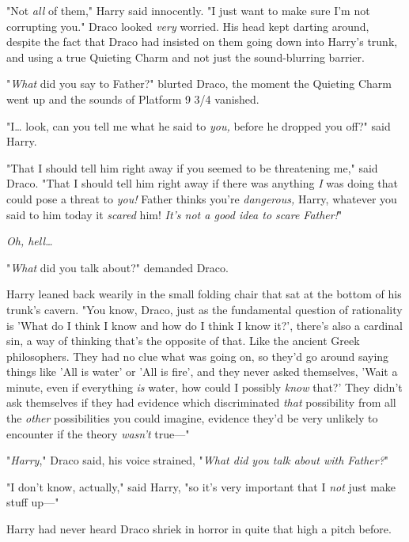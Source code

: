 "Not \emph{all} of them," Harry said innocently. "I just want to make sure I'm 
not corrupting you."
\sbreak
Draco looked \emph{very} worried. His head kept darting around, despite the 
fact that Draco had insisted on them going down into Harry's trunk, and using a 
true Quieting Charm and not just the sound-blurring barrier.

"\emph{What} did you say to Father?" blurted Draco, the moment the Quieting 
Charm went up and the sounds of Platform 9 3/4 vanished.

"I{\ldots} look, can you tell me what he said to \emph{you,} before he dropped 
you off?" said Harry.

"That I should tell him right away if you seemed to be threatening me," said 
Draco. "That I should tell him right away if there was anything \emph{I} was 
doing that could pose a threat to \emph{you!} Father thinks you're 
\emph{dangerous,} Harry, whatever you said to him today it \emph{scared} him! 
\emph{It's not a good idea to scare Father!}"

\emph{Oh, hell{\ldots}}

"\emph{What} did you talk about?" demanded Draco.

Harry leaned back wearily in the small folding chair that sat at the bottom of 
his trunk's cavern. "You know, Draco, just as the fundamental question of 
rationality is 'What do I think I know and how do I think I know it?', there's 
also a cardinal sin, a way of thinking that's the opposite of that. Like the 
ancient Greek philosophers. They had no clue what was going on, so they'd go 
around saying things like 'All is water' or 'All is fire', and they never asked 
themselves, 'Wait a minute, even if everything \emph{is} water, how could I 
possibly \emph{know} that?' They didn't ask themselves if they had evidence 
which discriminated \emph{that} possibility from all the \emph{other} 
possibilities you could imagine, evidence they'd be very unlikely to encounter 
if the theory \emph{wasn't} true---"

"\emph{Harry}," Draco said, his voice strained, "\emph{What did you talk about 
with Father?}"

"I don't know, actually," said Harry, "so it's very important that I \emph{not} 
just make stuff up---"

Harry had never heard Draco shriek in horror in quite that high a pitch before.
